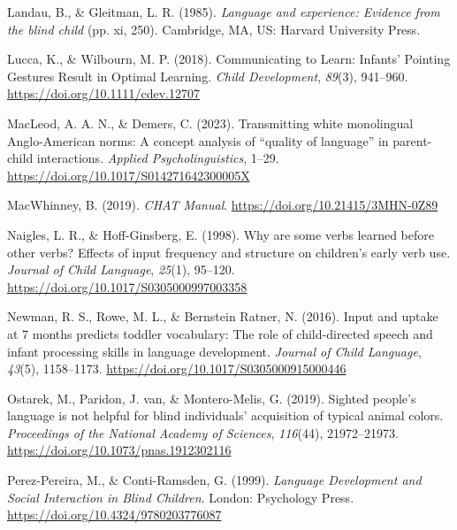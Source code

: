 \documentclass[
  man,floatsintext]{apa6}
\newlength{\cslhangindent}
\newlength{\cslentryspacingunit} %
\newenvironment{CSLReferences}[2] %
 {%
  \setlength{\parindent}{0pt}
  \ifodd #1
  \let\oldpar\par
  \def\par{\hangindent=\cslhangindent\oldpar}
  \fi
  \setlength{\parskip}{#2\cslentryspacingunit}
 }%
 {}
\begin{document}
\begin{CSLReferences}{1}{0}
\leavevmode{}%
Landau, B., \& Gleitman, L. R. (1985). \emph{Language and experience: {Evidence} from the blind child} (pp. xi, 250). {Cambridge, MA, US}: {Harvard University Press}.

\leavevmode{}%
Lucca, K., \& Wilbourn, M. P. (2018). Communicating to {Learn}: {Infants}' {Pointing Gestures Result} in {Optimal Learning}. \emph{Child Development}, \emph{89}(3), 941--960. \url{https://doi.org/10.1111/cdev.12707}

\leavevmode{}%
MacLeod, A. A. N., \& Demers, C. (2023). Transmitting white monolingual {Anglo-American} norms: {A} concept analysis of {``quality of language''} in parent-child interactions. \emph{Applied Psycholinguistics}, 1--29. \url{https://doi.org/10.1017/S014271642300005X}

\leavevmode{}%
MacWhinney, B. (2019). \emph{{CHAT Manual}}. \url{https://doi.org/10.21415/3MHN-0Z89}

\leavevmode{}%
Naigles, L. R., \& Hoff-Ginsberg, E. (1998). Why are some verbs learned before other verbs? {Effects} of input frequency and structure on children's early verb use. \emph{Journal of Child Language}, \emph{25}(1), 95--120. \url{https://doi.org/10.1017/S0305000997003358}

\leavevmode{}%
Newman, R. S., Rowe, M. L., \& Bernstein Ratner, N. (2016). Input and uptake at 7 months predicts toddler vocabulary: The role of child-directed speech and infant processing skills in language development. \emph{Journal of Child Language}, \emph{43}(5), 1158--1173. \url{https://doi.org/10.1017/S0305000915000446}

\leavevmode{}%
Ostarek, M., Paridon, J. van, \& Montero-Melis, G. (2019). Sighted people's language is not helpful for blind individuals' acquisition of typical animal colors. \emph{Proceedings of the National Academy of Sciences}, \emph{116}(44), 21972--21973. \url{https://doi.org/10.1073/pnas.1912302116}

\leavevmode{}%
Perez-Pereira, M., \& Conti-Ramsden, G. (1999). \emph{Language {Development} and {Social Interaction} in {Blind Children}}. {London}: {Psychology Press}. \url{https://doi.org/10.4324/9780203776087}


\end{CSLReferences}
\end{document}
